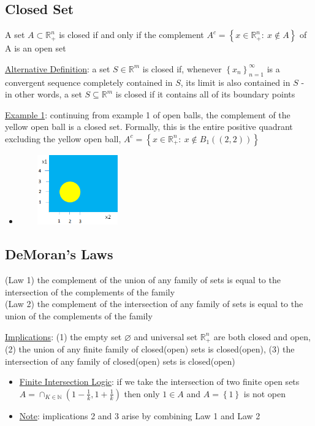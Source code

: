 \documentclass{article}
\begin{document}
\subsection{Closed Set}
A set $A \subset \mathbb{R}_{+}^{n}$ is closed if and only if the complement $A^{c} = \left\{ x \in \mathbb{R}_{+}^{n}: \ x \notin A \right\}$ of A is an open set \par \vspace{0.3em}
  \underline{Alternative Definition}: a set $S \in \mathbb{R}^{m}$ is closed if, whenever $\left\{ x_{n} \right\}_{n=1}^{\infty}$ is a convergent sequence completely contained in $S$, its limit is also contained in $S$ - in other words, a set $S \subseteq \mathbb{R}^{m}$ is closed if it contains all of its boundary points
  \par
  \underline{Example 1}: continuing from example 1 of open balls, the complement of the yellow open ball is a closed set. Formally, this is the entire positive quadrant excluding the yellow open ball, $A^{c} = \left\{ x \in \mathbb{R}_{+}^{n}: \ x \notin B_{1}((2,2)) \right\}$
  \begin{itemize}
    \item  \includegraphics[width=5cm, height=3cm]{pic4}
  \end{itemize}
  \par
\vspace{6mm}
\subsection{DeMoran's Laws}
(Law 1) the complement of the union of any family of sets is equal to the intersection of the complements of the family \\ (Law 2) the complement of the intersection of any family of sets is equal to the union of the complements of the family \par \vspace{0.3em}
  \underline{Implications}: (1) the empty set $\varnothing$ and universal set $\mathbb{R}_{+}^{n}$ are both closed and open, (2) the union of any finite family of closed(open) sets is closed(open), (3) the intersection of any family of closed(open) sets is closed(open)
  \begin{itemize}
    \item  \underline{Finite Intersection Logic}: if we take the intersection of two finite open sets $A = \cap_{K \in \mathbb{N}} (1 - \tfrac{1}{k}, 1 + \tfrac{1}{k})$ then only $1 \in A$ and $A = \left\{ 1 \right\}$ is not open
    \item  \underline{Note}: implications 2 and 3 arise by combining Law 1 and Law 2
  \end{itemize}
  \par
\vspace{6mm}
\end{document}
